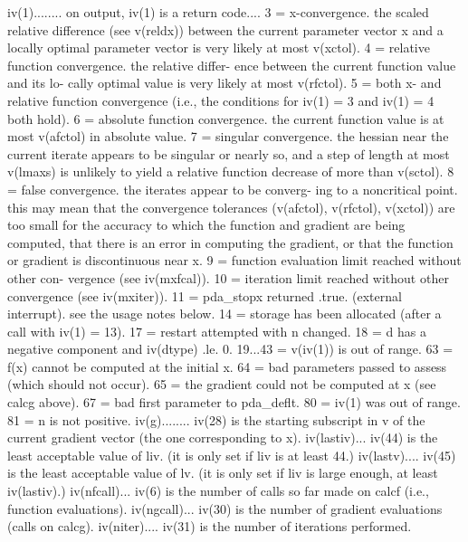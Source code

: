 \documentclass[11pt,twoside,nolof]{starlink}
\begin{document}
\begin{terminalv}
  iv(1)........ on output, iv(1) is a return code....
              3 = x-convergence.  the scaled relative difference (see
                   v(reldx)) between the current parameter vector x and
                   a locally optimal parameter vector is very likely at
                   most v(xctol).
              4 = relative function convergence.  the relative differ-
                   ence between the current function value and its lo-
                   cally optimal value is very likely at most v(rfctol).
              5 = both x- and relative function convergence (i.e., the
                   conditions for iv(1) = 3 and iv(1) = 4 both hold).
              6 = absolute function convergence.  the current function
                   value is at most v(afctol) in absolute value.
              7 = singular convergence.  the hessian near the current
                   iterate appears to be singular or nearly so, and a
                   step of length at most v(lmaxs) is unlikely to yield
                   a relative function decrease of more than v(sctol).
              8 = false convergence.  the iterates appear to be converg-
                   ing to a noncritical point.  this may mean that the
                   convergence tolerances (v(afctol), v(rfctol),
                   v(xctol)) are too small for the accuracy to which
                   the function and gradient are being computed, that
                   there is an error in computing the gradient, or that
                   the function or gradient is discontinuous near x.
              9 = function evaluation limit reached without other con-
                   vergence (see iv(mxfcal)).
             10 = iteration limit reached without other convergence
                   (see iv(mxiter)).
             11 = pda_stopx returned .true. (external interrupt).  see the
                   usage notes below.
             14 = storage has been allocated (after a call with
                   iv(1) = 13).
             17 = restart attempted with n changed.
             18 = d has a negative component and iv(dtype) .le. 0.
             19...43 = v(iv(1)) is out of range.
             63 = f(x) cannot be computed at the initial x.
             64 = bad parameters passed to assess (which should not
                   occur).
             65 = the gradient could not be computed at x (see calcg
                   above).
             67 = bad first parameter to pda_deflt.
             80 = iv(1) was out of range.
             81 = n is not positive.
  iv(g)........ iv(28) is the starting subscript in v of the current
              gradient vector (the one corresponding to x).
  iv(lastiv)... iv(44) is the least acceptable value of liv.  (it is
              only set if liv is at least 44.)
  iv(lastv).... iv(45) is the least acceptable value of lv.  (it is
              only set if liv is large enough, at least iv(lastiv).)
  iv(nfcall)... iv(6) is the number of calls so far made on calcf (i.e.,
              function evaluations).
  iv(ngcall)... iv(30) is the number of gradient evaluations (calls on
              calcg).
  iv(niter).... iv(31) is the number of iterations performed.


\end{terminalv}
\end{document}
